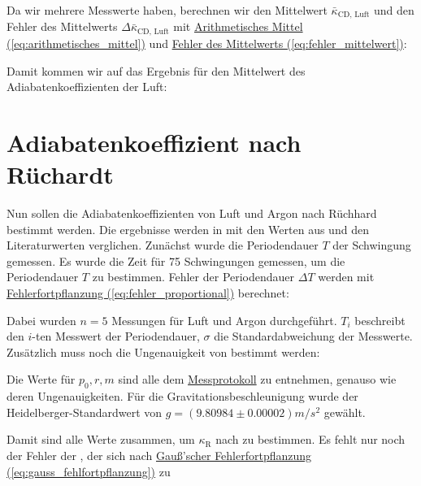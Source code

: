 Da wir mehrere Messwerte haben, berechnen wir den Mittelwert \(\bar{\kappa}_{\text{CD, Luft}}\) und den Fehler des Mittelwerts \(\Delta \bar{\kappa}_{\text{CD, Luft}}\) mit \hyperref[eq:arithmetisches_mittel]{Arithmetisches Mittel (\ref*{eq:arithmetisches_mittel})} und \hyperref[eq:fehler_mittelwert]{Fehler des Mittelwerts (\ref*{eq:fehler_mittelwert})}:


Damit kommen wir auf das Ergebnis für den Mittelwert des Adiabatenkoeffizienten der Luft:


\section{Adiabatenkoeffizient nach Rüchardt}
\label{sec:A2}

Nun sollen die Adiabatenkoeffizienten von Luft und Argon nach Rüchhard bestimmt werden. Die ergebnisse werden in  mit den Werten aus  und den Literaturwerten verglichen. Zunächst wurde die Periodendauer \(T\) der Schwingung gemessen. Es wurde die Zeit für 75 Schwingungen gemessen, um die Periodendauer \(T\) zu bestimmen. Fehler der Periodendauer \(\Delta T\) werden mit \hyperref[eq:fehler_proportional]{Fehlerfortpflanzung (\ref*{eq:fehler_proportional})} berechnet:


Dabei wurden $n = 5$ Messungen für Luft und Argon durchgeführt. $T_i$ beschreibt den $i$-ten Messwert der Periodendauer, $\sigma$ die Standardabweichung der Messwerte. 
Zusätzlich muss noch die Ungenauigkeit von  bestimmt werden:


Die Werte für $p_0, r, m$ sind alle dem \hyperref[ch:Protokoll]{Messprotokoll} zu entnehmen, genauso wie deren Ungenauigkeiten. Für die Gravitationsbeschleunigung wurde der Heidelberger-Standardwert von $g = (9.80984 \pm 0.00002) m/s^2$ gewählt.

Damit sind alle Werte zusammen, um $\kappa_\text{R}$ nach  zu bestimmen. Es fehlt nur noch der Fehler der , der sich nach \hyperref[eq:gauss_fehlfortpflanzung]{Gauß'scher Fehlerfortpflanzung (\ref*{eq:gauss_fehlfortpflanzung})} zu

